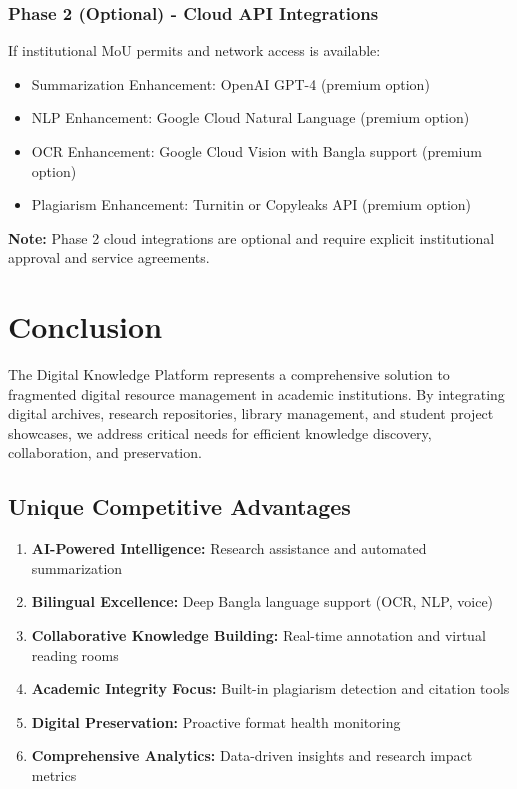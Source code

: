 \documentclass[12pt,a4paper]{report}
\begin{document}
\subsubsection{Phase 2 (Optional) - Cloud API Integrations}
If institutional MoU permits and network access is available:
\begin{itemize}
    \item Summarization Enhancement: OpenAI GPT-4 (premium option)
    \item NLP Enhancement: Google Cloud Natural Language (premium option)
    \item OCR Enhancement: Google Cloud Vision with Bangla support (premium option)
    \item Plagiarism Enhancement: Turnitin or Copyleaks API (premium option)
\end{itemize}
\textbf{Note:} Phase 2 cloud integrations are optional and require explicit institutional approval and service agreements.

\section{Conclusion}

The Digital Knowledge Platform represents a comprehensive solution to fragmented digital resource management in academic institutions. By integrating digital archives, research repositories, library management, and student project showcases, we address critical needs for efficient knowledge discovery, collaboration, and preservation.

\subsection{Unique Competitive Advantages}
\begin{enumerate}
    \item \textbf{AI-Powered Intelligence:} Research assistance and automated summarization
    \item \textbf{Bilingual Excellence:} Deep Bangla language support (OCR, NLP, voice)
    \item \textbf{Collaborative Knowledge Building:} Real-time annotation and virtual reading rooms
    \item \textbf{Academic Integrity Focus:} Built-in plagiarism detection and citation tools
    \item \textbf{Digital Preservation:} Proactive format health monitoring
    \item \textbf{Comprehensive Analytics:} Data-driven insights and research impact metrics
\end{enumerate}
\end{document}
